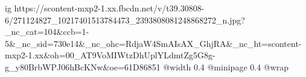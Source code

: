  
 
 
 
 

\ifcmt
  ig https://scontent-mxp2-1.xx.fbcdn.net/v/t39.30808-6/271124827_10217401513784473_2393808081248868272_n.jpg?_nc_cat=104&ccb=1-5&_nc_sid=730e14&_nc_ohc=RdjaW4SmAIsAX_GhjRA&_nc_ht=scontent-mxp2-1.xx&oh=00_AT9VoMIWtzDhUplYLdmtZg5G8g-g_y80BrbWPJ06hBcKNw&oe=61D86851
  @width 0.4
  @minipage 0.4
  @wrap \parpic[r]
\fi

